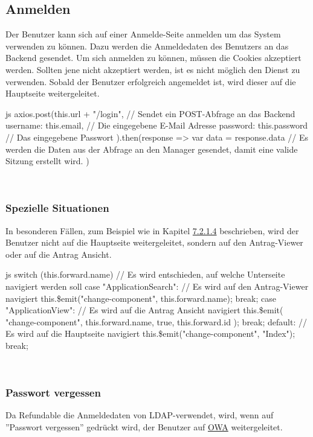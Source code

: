 \subsection{Anmelden}
Der Benutzer kann sich auf einer Anmelde-Seite anmelden um das System verwenden zu können. Dazu werden die Anmeldedaten des Benutzers an das Backend gesendet. Um sich anmelden zu können, müssen die Cookies akzeptiert werden. Sollten jene nicht akzeptiert werden, ist es nicht möglich den Dienst zu verwenden.
Sobald der Benutzer erfolgreich angemeldet ist, wird dieser auf die Hauptseite weitergeleitet.
\\
\begin{code}{js}
axios.post(this.url + "/login", {	// Sendet ein POST-Abfrage an das Backend
	username: this.email,	// Die eingegebene E-Mail Adresse
	password: this.password // Das eingegebene Passwort
}).then(response => {
	var data = response.data
	// Es werden die Daten aus der Abfrage an den Manager gesendet, damit eine valide Sitzung erstellt wird.
})
\end{code}
~\\

\subsubsection{Spezielle Situationen}
In besonderen Fällen, zum Beispiel wie in Kapitel \hyperref[sec:antrag_viewer]{7.2.1.4} beschrieben, wird der Benutzer nicht auf die Hauptseite weitergeleitet, sondern auf den Antrag-Viewer oder auf die Antrag Ansicht.
\begin{code}{js}
switch (this.forward.name) {	// Es wird entschieden, auf welche Unterseite navigiert werden soll
	case "ApplicationSearch":	// Es wird auf den Antrag-Viewer navigiert
	this.\$emit("change-component", this.forward.name);
	break;
	case "ApplicationView":	// Es wird auf die Antrag Ansicht navigiert
	this.\$emit(
	"change-component",
	this.forward.name,
	true,
	this.forward.id
	);
	break;
	default:	// Es wird auf die Hauptseite navigiert
	this.\$emit("change-component", "Index");
	break;
}
\end{code}
~\\
\subsubsection{Passwort vergessen}
Da Refundable die Anmeldedaten von LDAP-verwendet, wird, wenn auf ''Passwort vergessen'' gedrückt wird, der Benutzer auf \href{https://owa.tgm.ac.at}{OWA} weitergeleitet.
\newpage

